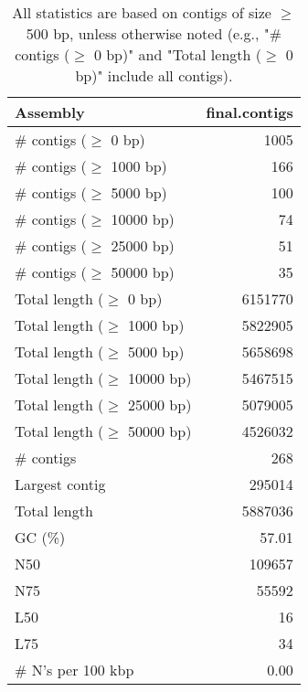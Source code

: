 \documentclass[12pt,a4paper]{article}
\begin{document}
\begin{table}[ht]
\begin{center}
\caption{All statistics are based on contigs of size $\geq$ 500 bp, unless otherwise noted (e.g., "\# contigs ($\geq$ 0 bp)" and "Total length ($\geq$ 0 bp)" include all contigs).}
\begin{tabular}{|l*{1}{|r}|}
\hline
Assembly & final.contigs \\ \hline
\# contigs ($\geq$ 0 bp) & 1005 \\ \hline
\# contigs ($\geq$ 1000 bp) & 166 \\ \hline
\# contigs ($\geq$ 5000 bp) & 100 \\ \hline
\# contigs ($\geq$ 10000 bp) & 74 \\ \hline
\# contigs ($\geq$ 25000 bp) & 51 \\ \hline
\# contigs ($\geq$ 50000 bp) & 35 \\ \hline
Total length ($\geq$ 0 bp) & 6151770 \\ \hline
Total length ($\geq$ 1000 bp) & 5822905 \\ \hline
Total length ($\geq$ 5000 bp) & 5658698 \\ \hline
Total length ($\geq$ 10000 bp) & 5467515 \\ \hline
Total length ($\geq$ 25000 bp) & 5079005 \\ \hline
Total length ($\geq$ 50000 bp) & 4526032 \\ \hline
\# contigs & 268 \\ \hline
Largest contig & 295014 \\ \hline
Total length & 5887036 \\ \hline
GC (\%) & 57.01 \\ \hline
N50 & 109657 \\ \hline
N75 & 55592 \\ \hline
L50 & 16 \\ \hline
L75 & 34 \\ \hline
\# N's per 100 kbp & 0.00 \\ \hline
\end{tabular}
\end{center}
\end{table}
\end{document}
